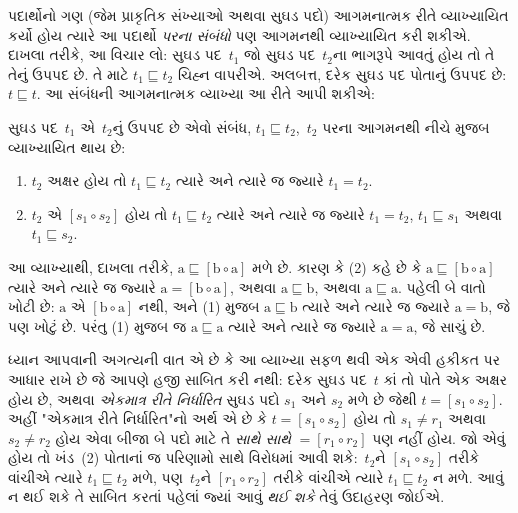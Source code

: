 \begingroup
\makeatletter{}\makeatother


\label{guunit:OLP-0619}


પદાર્થોનો ગણ (જેમ પ્રાકૃતિક સંખ્યાઓ અથવા સુઘડ પદો)
આગમનાત્મક રીતે વ્યાખ્યાયિત કર્યો હોય ત્યારે આ પદાર્થો
\emph{પરના સંબંધો} પણ આગમનથી વ્યાખ્યાયિત કરી શકીએ.
દાખલા તરીકે, આ વિચાર લો: સુઘડ પદ~$t_1$ જો સુઘડ
પદ~$t_2$ના ભાગરૂપે આવતું હોય તો તે તેનું ઉપપદ છે.
તે માટે $t_1 \sqsubseteq t_2$ ચિહ્ન વાપરીએ.
અલબત્ત, દરેક સુઘડ પદ પોતાનું ઉપપદ છે:
$t \sqsubseteq t$. આ સંબંધની આગમનાત્મક વ્યાખ્યા
આ રીતે આપી શકીએ:

\begin{defn}
  સુઘડ પદ~$t_1$ એ~$t_2$નું ઉપપદ છે એવો સંબંધ,
  $t_1 \sqsubseteq t_2$,~$t_2$ પરના આગમનથી
  નીચે મુજબ વ્યાખ્યાયિત થાય છે:
  \begin{enumerate}
  \item $t_2$ અક્ષર હોય તો $t_1 \sqsubseteq t_2$
    ત્યારે અને ત્યારે જ જ્યારે $t_1 = t_2$.
  \item $t_2$ એ $[s_1 \circ s_2]$ હોય તો
    $t_1 \sqsubseteq t_2$ ત્યારે અને ત્યારે જ જ્યારે
    $t_1 = t_2$, $t_1 \sqsubseteq s_1$ અથવા
    $t_1 \sqsubseteq s_2$.
  \end{enumerate}
\end{defn}

આ વ્યાખ્યાથી, દાખલા તરીકે, $\mathrm{a}
\sqsubseteq [\mathrm{b} \circ \mathrm{a}]$
મળે છે. કારણ કે (2) કહે છે કે
$\mathrm{a} \sqsubseteq [\mathrm{b} \circ \mathrm{a}]$
ત્યારે અને ત્યારે જ જ્યારે
$\mathrm{a} = [\mathrm{b} \circ \mathrm{a}]$,
અથવા $\mathrm{a} \sqsubseteq \mathrm{b}$,
અથવા $\mathrm{a} \sqsubseteq \mathrm{a}$.
પહેલી બે વાતો ખોટી છે: $\mathrm{a}$ એ
$[\mathrm{b} \circ
  \mathrm{a}]$ નથી, અને (1) મુજબ
$\mathrm{a} \sqsubseteq \mathrm{b}$
ત્યારે અને ત્યારે જ જ્યારે $\mathrm{a} = \mathrm{b}$,
જે પણ ખોટું છે. પરંતુ (1) મુજબ જ
$\mathrm{a} \sqsubseteq \mathrm{a}$
ત્યારે અને ત્યારે જ જ્યારે $\mathrm{a} = \mathrm{a}$,
જે સાચું છે.

ધ્યાન આપવાની અગત્યની વાત એ છે કે આ વ્યાખ્યા
સફળ થવી એક એવી હકીકત પર આધાર રાખે છે જે
આપણે હજી સાબિત કરી નથી: દરેક સુઘડ પદ~$t$
કાં તો પોતે એક અક્ષર હોય છે, અથવા
\emph{એકમાત્ર રીતે નિર્ધારિત} સુઘડ પદો
$s_1$ અને $s_2$ મળે છે જેથી
$t = [s_1 \circ s_2]$. અહીં "એકમાત્ર રીતે
નિર્ધારિત"નો અર્થ એ છે કે
$t = [s_1 \circ s_2]$ હોય તો
$s_1 \neq r_1$ અથવા $s_2 \neq r_2$ હોય
એવા બીજા બે પદો માટે તે \emph{સાથે સાથે}
$= [r_1 \circ r_2]$ પણ નહીં હોય. જો એવું
હોય તો ખંડ~(2) પોતાનાં જ પરિણામો સાથે
વિરોધમાં આવી શકે:~$t_2$ને
$[s_1 \circ s_2]$ તરીકે વાંચીએ ત્યારે
$t_1 \sqsubseteq t_2$ મળે, પણ~$t_2$ને
$[r_1 \circ r_2]$ તરીકે વાંચીએ ત્યારે
$t_1 \sqsubseteq t_2$ ન મળે. આવું ન
થઈ શકે તે સાબિત કરતાં પહેલાં જ્યાં
આવું \emph{થઈ શકે} તેવું ઉદાહરણ જોઈએ.

